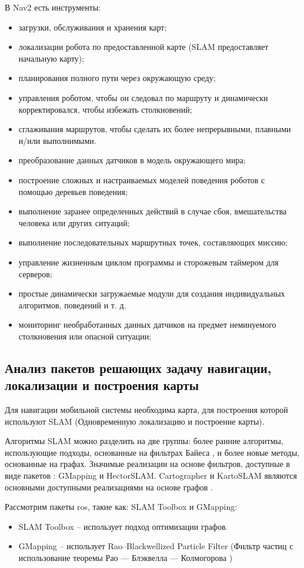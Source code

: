 В Nav2 есть инструменты:
\begin{itemize}
	\item загрузки, обслуживания и хранения карт;
	\item локализации робота по предоставленной карте (SLAM предоставляет
		начальную карту);
	\item планирования полного пути через окружающую среду;
	\item управления роботом, чтобы он следовал по маршруту и динамически
		корректировался, чтобы избежать столкновений;
	\item сглаживания маршрутов, чтобы сделать их более непрерывными, плавными
		и/или выполнимыми.
	\item преобразование данных датчиков в модель окружающего мира;
	\item построение сложных и настраиваемых моделей поведения роботов с
		помощью деревьев поведения;
	\item выполнение заранее определенных действий в случае сбоя, вмешательства
		человека или других ситуаций;
	\item выполнение последовательных маршрутных точек, составляющих миссию;
	\item управление жизненным циклом программы и сторожевым таймером для
		серверов;
	\item простые динамически загружаемые модули для создания индивидуальных
		алгоритмов, поведений и т. д.
	\item мониторинг необработанных данных датчиков на предмет неминуемого
		столкновения или опасной ситуации;
\end{itemize}

\subsection{Анализ пакетов решающих задачу навигации, локализации и построения
карты}

Для навигации мобильной системы необходима карта, для построения которой
используют SLAM (Одновременную локализацию и построение карты). 

Алгоритмы SLAM можно разделить на две группы: более ранние алгоритмы,
использующие подходы, основанные на фильтрах Байеса , и более новые методы,
основанные на графах. Значимые реализации на основе фильтров, доступные в виде
пакетов \ros{}: GMapping и HectorSLAM. Cartographer и KartoSLAM являются
основными доступными реализациями на основе графов \cite{macenski2021slam}.

Рассмотрим пакеты ros{}, такие как: SLAM Toolbox и GMapping:
\begin{itemize}
	\item SLAM Toolbox -- использует подход оптимизации
		графов.
	\item GMapping \cite{grisetti2005improving} -- использует Rao–Blackwellized
		Particle Filter (Фильтр частиц с использование теоремы Рао — Блэквелла —
		Колмогорова )
\end{itemize}

